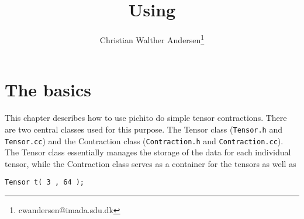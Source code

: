 \documentclass[paper=a4, oneside]{memoir}
\title{Using \packagename}
\author{Christian Walther Andersen\thanks{cwandersen@imada.sdu.dk}}
\newcommand{\packagename}{pichi}
\begin{document}

\lstset{style=cc++}

\maketitle %

\chapter*{The basics}

This chapter describes how to use \packagename to do simple tensor 
contractions. There are two central classes used for this purpose. The Tensor 
class (\texttt{Tensor.h} and \texttt{Tensor.cc}) and the Contraction class 
(\texttt{Contraction.h} and \texttt{Contraction.cc}). The Tensor class 
essentially manages the storage of the data for each individual tensor, while 
the Contraction class serves as a container for the tensors as well as 


\begin{lstlisting}
Tensor t( 3 , 64 );
\end{lstlisting}
\end{document}
